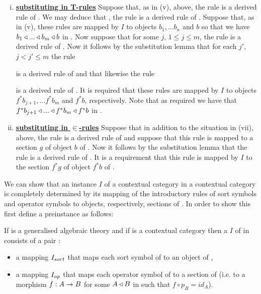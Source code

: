 \begin{definition}
\begin{enumerate}[(i)]
\item \underline{\textbf{substituting in T-rules}} 
Suppose that, as in (v), above, the rule 
 is a derived rule of \gatU.
We may deduce that \foreachj, the rule    is a derived rule of \gatU. 
Suppose that, as in (v), these rules are mapped by $I$ to objects $b_1,...b_n$ and $b$ so that
we have  $b_1 \triangleleft ... \triangleleft b_m \triangleleft b$ in \catc. Now suppose that for some $j$, $1 \leq j \leq m$, the rule
 is a derived rule of \gatU. 
Now it follows by the substitution lemma that for each $j'$, $j < j' \leq m$ the rule

 is a derived rule of \gatUw and that likewise the rule

 is a derived rule of \gatU.
It is required that these rules are mapped by $I$ to objects $f^*b_{j+1},...f^*b_m$ and $f^*b$, respectively.
Note that as required we have that $f^*b_{j+1}\triangleleft ... \triangleleft f^*b_m \triangleleft f^*b$ in \catc.

\item \underline{\textbf{substituting in $\boldsymbol {\in}$-rules}} 
Suppose that in addition to the situation in (vii), above, the rule
is a derived rule of \gatUw and suppose that this rule is mapped to a section $g$ of object $b$ of \catc.
Now it follows by the substitution lemma that the rule
is a derived rule of \gatU.
It is a requirement that this rule is mapped by $I$ to the section $f^*g$ of object $f^*b$ of \catc.
\end{enumerate}
\end{definition}

\note
We can show that an instance $I$ of a contextual category \gatUw in a contextual category \catcw is
completely determined by its mapping of the introductory rules of sort symbols and operator symbols to
objects, respectively, sections of \catc. In order to show this first define a preinstance as follows:
\begin{definition}
If \gatUw is a generalised algebraic theory  and if \catcw is a contextual category then
a  $I$ of  \gatUw in \catcw consists of a pair :
\begin{itemize}
\item a mapping $I_{sort}$ that maps each sort symbol of \gatUw to  an object of \catc,
\item a mapping $I_{op}$ that maps each operator symbol of \gatUw to a section of \catcw (i.e. to a morphism $f: A \rightarrow B$ for some 
$A \triangleleft B$ in \catcw such that $f \circ p_B=id_A$).
\end{itemize}
\end{definition}

